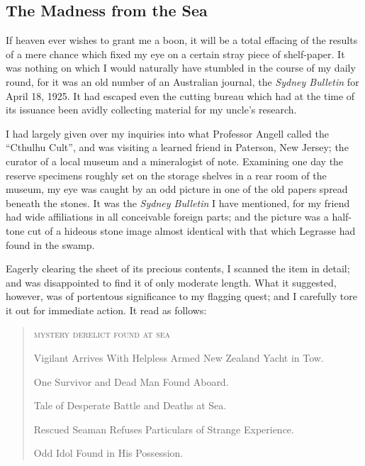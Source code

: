 \Pages

\begin{pages}
    \begin{Leftside}
        \beginnumbering
            \pstart

\chapter*{The Madness from the Sea}

\noindent{}If heaven ever wishes to grant me a boon, it will be a total effacing of
the results of a mere chance which fixed my eye on a certain stray piece
of shelf-paper. It was nothing on which I would naturally have stumbled
in the course of my daily round, for it was an old number of an
Australian journal, the \emph{Sydney Bulletin} for April 18, 1925. It had
escaped even the cutting bureau which had at the time of its issuance
been avidly collecting material for my uncle's research.

I had largely given over my inquiries into what Professor Angell called
the ``Cthulhu Cult'', and was visiting a learned friend in Paterson, New
Jersey; the curator of a local museum and a mineralogist of note.
Examining one day the reserve specimens roughly set on the storage
shelves in a rear room of the museum, my eye was caught by an odd
picture in one of the old papers spread beneath the stones. It was the
\emph{Sydney Bulletin} I have mentioned, for my friend had wide affiliations in
all conceivable foreign parts; and the picture was a half-tone cut of a
hideous stone image almost identical with that which Legrasse had found
in the swamp.

Eagerly clearing the sheet of its precious contents, I scanned the item
in detail; and was disappointed to find it of only moderate length. What
it suggested, however, was of portentous significance to my flagging
quest; and I carefully tore it out for immediate action. It read as
follows:

\begin{quote}
\textsc{mystery derelict found at sea}

Vigilant Arrives With Helpless Armed New Zealand Yacht in Tow.

One Survivor and Dead Man Found Aboard.

Tale of Desperate Battle and Deaths at Sea.

Rescued Seaman Refuses Particulars of Strange Experience.

Odd Idol Found in His Possession.


\end{quote}
\end{Leftside}
\end{pages}
